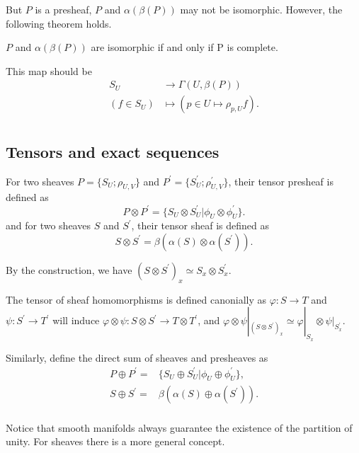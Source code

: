 \documentclass[twoside]{article}
\begin{document}
 But $P$ is a presheaf, $P$ and $\alpha(\beta(P))$ may not be isomorphic. However, the following theorem holds.

 \begin{theorem}
   $P$ and $\alpha(\beta(P))$ are isomorphic if and only if P is complete.
 \end{theorem}

  This map should be
  $$
  \begin{aligned}
    S_U&\to \Gamma(U,\beta(P))\\
    (f\in S_U)&\mapsto (p\in U\mapsto \rho_{p,U}f).\\
  \end{aligned}
  $$

\subsection{Tensors  and exact sequences}


\begin{definition}

For two sheaves $P=\{S_U;\rho_{U,V}\}$ and $P^\prime=\{S_U^\prime;\rho_{U,V}^\prime\}$,   their tensor  presheaf  is defined as $$
P\otimes P^\prime=\{S_U\otimes S_U^\prime|  \phi_U\otimes \phi_{U}^\prime\}.
$$
and for two sheaves $S$ and $S^\prime$, their tensor sheaf is defined as   $$S\otimes S^\prime=\beta(\alpha(S)\otimes \alpha(S^\prime)).$$

\end{definition}


By the construction, we have $(S\otimes S^\prime)_x\simeq S_x\otimes S_x^\prime$.

The tensor of sheaf homomorphisms is defined canonially as $\varphi:S\to T$ and $\psi:S^\prime\to T^\prime$ will induce $\varphi\otimes \psi:S\otimes S^\prime\to T\otimes T^\prime$, and $\varphi\otimes \psi|_{(S\otimes S^\prime)_x}\simeq \varphi|_{S_x}\otimes \psi|_{S_x^\prime}$.

Similarly,  define the direct sum of sheaves and presheaves as $$\begin{aligned}
P\oplus P^\prime=&\{S_U\oplus S_U^\prime|  \phi_U\oplus \phi_{U}^\prime\},\\
S\oplus S^\prime=&\beta(\alpha(S)\oplus \alpha(S^\prime)).\\
\end{aligned}
$$


Notice that  smooth manifolds always guarantee the existence of   the partition of unity. For sheaves there is  a more general concept.
\end{document}

